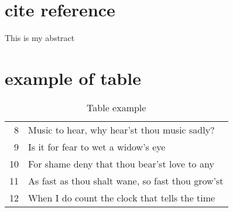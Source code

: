 \section{cite reference}

This is my abstract \cite{cont2010stochastic}

\section{example of table}
\begin{table}
	\caption{Table example}
	\label{sonnets}
	\begin{center}
		\begin{tabular}{|r| p{5cm} |}
			\hline
			8 & Music to hear, why hear'st thou music sadly? \\[5pt]
			9 & Is it for fear to wet a widow's eye \\[5pt]
			10 & For shame deny that thou bear'st love to any \\[5pt]
			11 & As fast as thou shalt wane, so fast thou grow'st \\[5pt]
			12 & When I do count the clock that tells the time \\
			\hline 
		\end{tabular}
	\end{center}
\end{table}